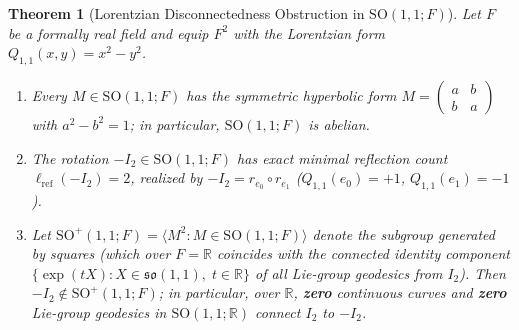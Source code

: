 \documentclass[11pt,a4paper]{article}
\theoremstyle{plain}
\newtheorem{theorem}{Theorem}[section]
\theoremstyle{definition}
\newcommand{\R}{\mathbb{R}}
\newcommand{\SO}{\mathrm{SO}}
\newcommand{\lref}{\ell_{\mathrm{ref}}}
\begin{document}
\begin{theorem}[Lorentzian Disconnectedness Obstruction in $\SO(1, 1; F)$]
\label{thm:lorentz}
Let $F$ be a formally real field and equip $F^2$ with the Lorentzian form $Q_{1,1}(x, y) = x^2 - y^2$.
\begin{enumerate}
\item Every $M \in \SO(1, 1; F)$ has the symmetric hyperbolic form $M = \begin{pmatrix}a & b\\ b & a\end{pmatrix}$ with $a^2 - b^2 = 1$; in particular, $\SO(1, 1; F)$ is \emph{abelian}.
\item The rotation $-I_2 \in \SO(1, 1; F)$ has exact minimal reflection count $\lref(-I_2) = 2$, realized by $-I_2 = r_{e_0} \circ r_{e_1}$ ($Q_{1,1}(e_0) = +1$, $Q_{1,1}(e_1) = -1$).
\item Let $\SO^+(1, 1; F) = \langle M^2 : M \in \SO(1, 1; F) \rangle$ denote the subgroup generated by squares (which over $F = \R$ coincides with the connected identity component $\{\exp(t X) : X \in \mathfrak{so}(1,1),\; t \in \R\}$ of all Lie-group geodesics from $I_2$). Then $-I_2 \notin \SO^+(1, 1; F)$; in particular, over $\R$, \textbf{zero} continuous curves and \textbf{zero} Lie-group geodesics in $\SO(1, 1; \R)$ connect $I_2$ to $-I_2$.
\end{enumerate}
\end{theorem}
\end{document}
